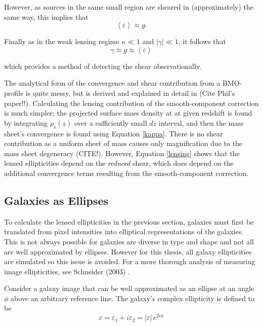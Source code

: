 \documentclass[%
 reprint,
 amsmath,amssymb,
 aps,nofootinbib
]{revtex4-1}
\begin{document}
\noindent However, as sources in the same small region are sheared in (approximately) the same way, this implies that
\begin{equation}
\left<\varepsilon\right>\approx g.
\end{equation}

 \noindent Finally as in the weak lensing regime ${\kappa\ll1}$ and ${|\gamma|\ll1}$, it follows that
 \begin{equation}
 \gamma\approx g\approx\left<\varepsilon\right>
 \end{equation}

 \noindent which provides a method of detecting the shear observationally.

 The analytical form of the convergence and shear contribution from a BMO-profile is quite messy, but is derived and explained in detail in (Cite Phil's paper!!). Calculating the lensing contribution of the smooth-component correction is much simpler; the projected surface mass density at at given redshift is found by integrating $\rho_s(z)$ over a sufficiently small $dz$ interval, and then the mass sheet's convergence is found using Equation \eqref{kappa}. There is no shear contribution as a uniform sheet of mass causes only magnification due to the mass sheet degeneracy (CITE!). However, Equation \eqref{lensing} shows that the lensed ellipticities depend on the \textit{reduced} shear, which does depend on the additional convergence terms resulting from the smooth-component correction.

\subsection{Galaxies as Ellipses} \label{galaxies_as_ellipses}

To calculate the lensed ellipticities in the previous section, galaxies must first be translated from pixel intensities into elliptical representations of the galaxies. This is not always possible for galaxies are diverse in type and shape and not all are well approximated by ellipses. However for this thesis, all galaxy ellipticities are simulated so this issue is avoided. For a more thorough analysis of measuring image ellipticities, see Schneider (2003) \cite{schneider}.

Consider a galaxy image that can be well approximated as an ellipse at an angle $\phi$ above an arbitrary reference line. The galaxy's complex ellipticity is defined to be
\begin{equation}\label{complex_ellipticity}
\varepsilon=\varepsilon_1+i\varepsilon_2=|\varepsilon|\,e^{2i\phi}
\end{equation}
\end{document}
